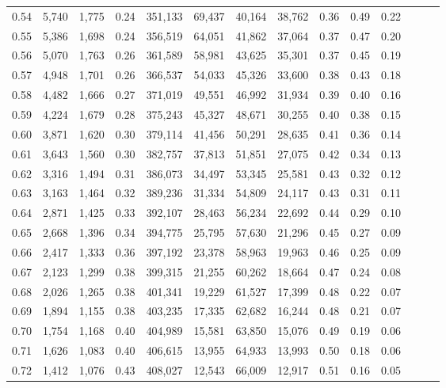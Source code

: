 \begin{tabular}{rrrrrrrrrrrrrr}
0.54 &  5,740 &  1,775 &  0.24 &  351,133 &   69,437 &  40,164 &  38,762 &  0.36 &  0.49 &      0.22 \\
0.55 &  5,386 &  1,698 &  0.24 &  356,519 &   64,051 &  41,862 &  37,064 &  0.37 &  0.47 &      0.20 \\
0.56 &  5,070 &  1,763 &  0.26 &  361,589 &   58,981 &  43,625 &  35,301 &  0.37 &  0.45 &      0.19 \\
0.57 &  4,948 &  1,701 &  0.26 &  366,537 &   54,033 &  45,326 &  33,600 &  0.38 &  0.43 &      0.18 \\
0.58 &  4,482 &  1,666 &  0.27 &  371,019 &   49,551 &  46,992 &  31,934 &  0.39 &  0.40 &      0.16 \\
0.59 &  4,224 &  1,679 &  0.28 &  375,243 &   45,327 &  48,671 &  30,255 &  0.40 &  0.38 &      0.15 \\
0.60 &  3,871 &  1,620 &  0.30 &  379,114 &   41,456 &  50,291 &  28,635 &  0.41 &  0.36 &      0.14 \\
0.61 &  3,643 &  1,560 &  0.30 &  382,757 &   37,813 &  51,851 &  27,075 &  0.42 &  0.34 &      0.13 \\
0.62 &  3,316 &  1,494 &  0.31 &  386,073 &   34,497 &  53,345 &  25,581 &  0.43 &  0.32 &      0.12 \\
0.63 &  3,163 &  1,464 &  0.32 &  389,236 &   31,334 &  54,809 &  24,117 &  0.43 &  0.31 &      0.11 \\
0.64 &  2,871 &  1,425 &  0.33 &  392,107 &   28,463 &  56,234 &  22,692 &  0.44 &  0.29 &      0.10 \\
0.65 &  2,668 &  1,396 &  0.34 &  394,775 &   25,795 &  57,630 &  21,296 &  0.45 &  0.27 &      0.09 \\
0.66 &  2,417 &  1,333 &  0.36 &  397,192 &   23,378 &  58,963 &  19,963 &  0.46 &  0.25 &      0.09 \\
0.67 &  2,123 &  1,299 &  0.38 &  399,315 &   21,255 &  60,262 &  18,664 &  0.47 &  0.24 &      0.08 \\
0.68 &  2,026 &  1,265 &  0.38 &  401,341 &   19,229 &  61,527 &  17,399 &  0.48 &  0.22 &      0.07 \\
0.69 &  1,894 &  1,155 &  0.38 &  403,235 &   17,335 &  62,682 &  16,244 &  0.48 &  0.21 &      0.07 \\
0.70 &  1,754 &  1,168 &  0.40 &  404,989 &   15,581 &  63,850 &  15,076 &  0.49 &  0.19 &      0.06 \\
0.71 &  1,626 &  1,083 &  0.40 &  406,615 &   13,955 &  64,933 &  13,993 &  0.50 &  0.18 &      0.06 \\
0.72 &  1,412 &  1,076 &  0.43 &  408,027 &   12,543 &  66,009 &  12,917 &  0.51 &  0.16 &      0.05 \\

\end{tabular}
